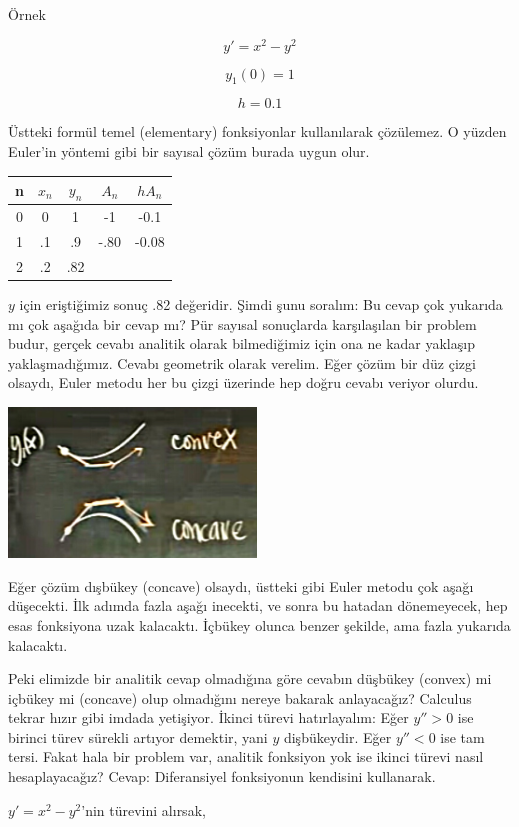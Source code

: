 \documentclass[12pt,fleqn]{article}\usepackage{../../common}
\begin{document}
Örnek

$$ y' = x^2 - y^2 $$

$$ y_1(0) = 1 $$

$$ h = 0.1 $$

Üstteki formül temel (elementary) fonksiyonlar kullanılarak çözülemez. O yüzden
Euler'in yöntemi gibi bir sayısal çözüm burada uygun olur. 

\begin{tabular}{ccccc}
n & $x_n$ & $y_n$ & $A_n$ & $hA_n$ \\
\hline
0 & 0 & 1 & -1 & -0.1 \\
\hline
1 & .1 & .9 & -.80 & -0.08 \\
\hline
2 & .2 & .82 &  & 
\end{tabular}

$y$ için eriştiğimiz sonuç .82 değeridir. Şimdi şunu soralım: Bu cevap çok
yukarıda mı çok aşağıda bir cevap mı? Pür sayısal sonuçlarda karşılaşılan bir
problem budur, gerçek cevabı analitik olarak bilmediğimiz için ona ne kadar
yaklaşıp yaklaşmadığımız. Cevabı geometrik olarak verelim. Eğer çözüm bir düz
çizgi olsaydı, Euler metodu her bu çizgi üzerinde hep doğru cevabı veriyor
olurdu. 

\includegraphics[height=4cm]{2_2.jpg}

Eğer çözüm dışbükey (concave) olsaydı, üstteki gibi Euler metodu çok aşağı
düşecekti. İlk adımda fazla aşağı inecekti, ve sonra bu hatadan dönemeyecek, hep
esas fonksiyona uzak kalacaktı. İçbükey olunca benzer şekilde, ama fazla
yukarıda kalacaktı. 

Peki elimizde bir analitik cevap olmadığına göre cevabın düşbükey (convex) mi
içbükey mi (concave) olup olmadığını nereye bakarak anlayacağız? Calculus tekrar
hızır gibi imdada yetişiyor. İkinci türevi hatırlayalım: Eğer $y'' > 0$ ise
birinci türev sürekli artıyor demektir, yani $y$ dişbükeydir. Eğer $y'' < 0$ ise
tam tersi. Fakat hala bir problem var, analitik fonksiyon yok ise ikinci türevi
nasıl hesaplayacağız? Cevap: Diferansiyel fonksiyonun kendisini kullanarak.

$y' = x^2 - y^2$'nin türevini alırsak, 
\end{document}
